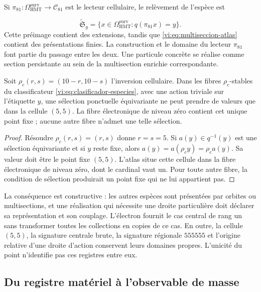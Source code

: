 Si $\pi_{81}:\Omega^{\mathrm{surv}}_{\mathrm{HMT}}\to
\mathcal C_{81}$ est le lecteur cellulaire, le relèvement de l’espèce est

\begin{equation}
 \widetilde{\mathfrak S}_y
 =\{x\in\Omega^{\mathrm{surv}}_{\mathrm{HMT}}:
                  q(\pi_{81}x)=y\}.
 \label{vi:eq:multiseccion-enriquecida}
\end{equation}
Cette préimage contient des extensions, tandis que
\eqref{vi:eq:multiseccion-atlas} contient des présentations finies. La
construction et le domaine du lecteur $\pi_{81}$ font partie du passage
entre les deux. Une particule concrète se réalise comme section persistante
au sein de la multisection enrichie correspondante.


\begin{theorem}
\label{vi:thm:selector-central}
Soit $\rho_c(r,s)=(10-r,10-s)$ l’inversion cellulaire. Dans les fibres
$\rho_c$-stables du classificateur \eqref{vi:eq:clasificador-especies},
avec une action triviale sur l’étiquette $y$, une sélection ponctuelle
équivariante ne peut prendre de valeurs que dans la cellule $(5,5)$. La fibre
électronique de niveau zéro contient cet unique point fixe ; aucune autre
fibre n’admet une telle sélection.

\end{theorem}
\begin{proof}
Résoudre $\rho_c(r,s)=(r,s)$ donne $r=s=5$. Si $a(y)\in q^{-1}(y)$
est une sélection équivariante et si $y$ reste fixe, alors
$a(y)=a(\rho_c y)=\rho_c a(y)$. Sa valeur doit être le point fixe
$(5,5)$. L’atlas situe cette cellule dans la fibre électronique de niveau
zéro, dont le cardinal vaut un. Pour toute autre fibre, la condition
de sélection produirait un point fixe qui ne lui appartient pas.

\end{proof}

La conséquence est constructive : les autres espèces sont présentées par
orbites ou multisections, et une réalisation qui nécessite une droite
particulière doit déclarer sa représentation et son couplage. L’électron
fournit le cas central de rang un sans transformer toutes
les collections en copies de ce cas. En outre, la cellule $(5,5)$, la signature
centrale brute, la signature régionale $555555$ et l’origine relative d’une
droite d’action conservent leurs domaines propres. L’unicité du point
n’identifie pas ces registres entre eux.


\subsection{Du registre matériel à l’observable de masse
}
\label{vi:subsec:particula-observable}

